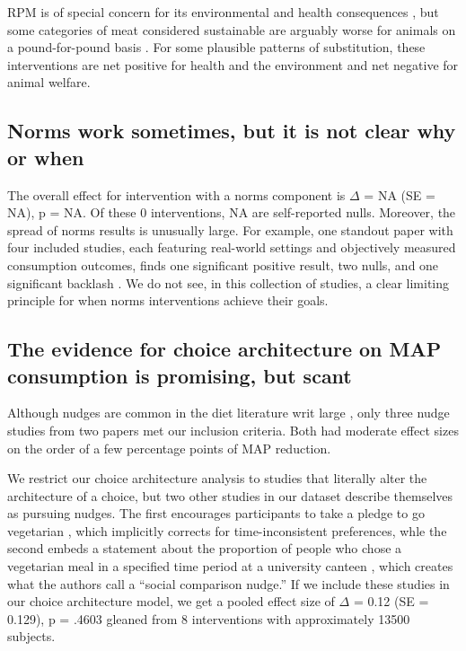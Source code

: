 \documentclass[sn-nature,pdflatex]{sn-jnl}
\begin{document}
RPM is of special concern for its environmental and health consequences
\citep{grummon2023}, but some categories of meat considered sustainable
are arguably worse for animals on a pound-for-pound basis
\citep{mathur2022ethical}. For some plausible patterns of substitution,
these interventions are net positive for health and the environment and
net negative for animal welfare.

\subsection{Norms work sometimes, but it is not clear why or
when}\label{sec2.4}

The overall effect for intervention with a norms component is \(\Delta\)
= NA (SE = NA), p = NA. Of these 0 interventions, NA are self-reported
nulls. Moreover, the spread of norms results is unusually large. For
example, one standout paper with four included studies, each featuring
real-world settings and objectively measured consumption outcomes, finds
one significant positive result, two nulls, and one significant backlash
\citep{sparkman2020}. We do not see, in this collection of studies, a
clear limiting principle for when norms interventions achieve their
goals.

\begin{comment} say something about dannenberg 2024 or the 2024 meta-analysis that finds vey little?
\end{comment}

\subsection{The evidence for choice architecture on MAP consumption is
promising, but scant}\label{sec2.5}

Although nudges are common in the diet literature writ large
\citep{olafsson2024, cadario2020, szaszi2018}, only three nudge studies
from two papers \citep[@][]{kanchanachitra2020, andersson2021} met our
inclusion criteria. Both had moderate effect sizes on the order of a few
percentage points of MAP reduction.

We restrict our choice architecture analysis to studies that literally
alter the architecture of a choice, but two other studies in our dataset
describe themselves as pursuing nudges. The first encourages
participants to take a pledge to go vegetarian \citep{banerjee2019},
which implicitly corrects for time-inconsistent preferences, whle the
second embeds a statement about the proportion of people who chose a
vegetarian meal in a specified time period at a university canteen
\citep{griesoph2021}, which creates what the authors call a ``social
comparison nudge.'' If we include these studies in our choice
architecture model, we get a pooled effect size of \(\Delta\) = 0.12 (SE
= 0.129), p = .4603 gleaned from 8 interventions with approximately
13500 subjects.
\end{document}
